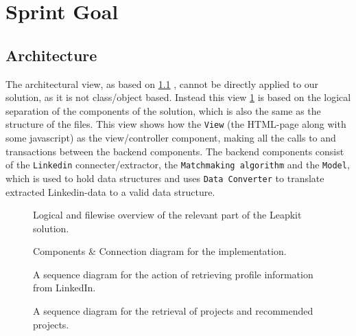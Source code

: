 \section{Sprint Goal}


\subsection{Architecture}
The architectural view, as based on \ref{}%
, cannot be directly applied to our solution, as it is not class/object based. Instead this view \ref{fig:overview} is based on the logical separation of the components of the solution, which is also the same as the structure of the files. This view shows how the \texttt{View} (the HTML-page along with some javascript) as the view/controller component, making all the calls to and transactions between the backend components. The backend components consist of the \texttt{Linkedin} connecter/extractor, the \texttt{Matchmaking algorithm} and the \texttt{Model}, which is used to hold data structures and uses \texttt{Data Converter} to translate extracted Linkedin-data to a valid data structure.

\begin{figure}[ht]
    \centering
    \scalebox{1}{}
    \caption{Logical and filewise overview of the relevant part of the Leapkit solution.}
    \label{fig:overview}
\end{figure}


\begin{figure}[ht]
    \centering
    \scalebox{1}{}
    \caption{Components \& Connection diagram for the implementation.}
    \label{fig:packages}
\end{figure}


\begin{figure}[ht]
    \centering
    \scalebox{1}{}
    \caption{A sequence diagram for the action of retrieving profile information from LinkedIn.}
    \label{fig:sequence}
\end{figure}


\begin{figure}
    \centering
    \scalebox{1}{}
    \caption{A sequence diagram for the retrieval of projects and recommended projects.}
    \label{fig:projectsequence}
\end{figure}

